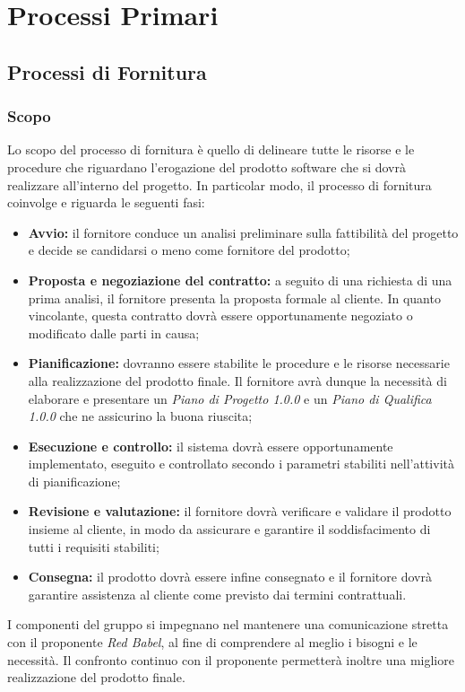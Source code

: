 \section{Processi Primari}
\subsection{Processi di Fornitura}
\subsubsection{Scopo}
Lo scopo del processo di fornitura è quello di delineare tutte le risorse e le procedure che riguardano l'erogazione del prodotto software che si dovrà realizzare all'interno del progetto. In particolar modo, il processo di fornitura coinvolge e riguarda le seguenti fasi:
\begin{itemize}
	\item \textbf{Avvio:} il fornitore conduce un analisi preliminare sulla fattibilità del progetto e decide se candidarsi o meno come fornitore del prodotto;
	\item \textbf{Proposta e negoziazione del contratto:} a seguito di una richiesta di una prima analisi, il fornitore presenta la proposta formale al cliente. In quanto vincolante, questa contratto dovrà essere opportunamente negoziato o modificato dalle parti in causa;
	\item \textbf{Pianificazione:} dovranno essere stabilite le procedure e le risorse necessarie alla realizzazione del prodotto finale. Il fornitore avrà dunque la necessità di elaborare e presentare un \textit{Piano di Progetto 1.0.0\doc} e un \textit{Piano di Qualifica 1.0.0\doc} che ne assicurino la buona riuscita;
	\item \textbf{Esecuzione e controllo:} il sistema dovrà essere opportunamente implementato, eseguito e controllato secondo i parametri stabiliti nell'attività di pianificazione;
	\item \textbf{Revisione e valutazione:} il fornitore dovrà verificare e validare il prodotto insieme al cliente, in modo da assicurare e garantire il soddisfacimento di tutti i requisiti stabiliti;
	\item \textbf{Consegna:} il prodotto dovrà essere infine consegnato e il fornitore dovrà garantire assistenza al cliente come previsto dai termini contrattuali.
\end{itemize} 
I componenti del gruppo si impegnano nel mantenere una comunicazione stretta con il proponente \textit{Red Babel}, al fine di comprendere al meglio i bisogni e le necessità. Il confronto continuo con il proponente permetterà inoltre una migliore realizzazione del prodotto finale.

